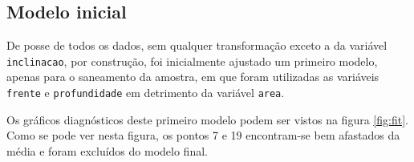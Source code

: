 \documentclass[a4paper, 12pt]{article}
\begin{document}
\hypertarget{modelo-inicial}{%
\subsection{Modelo inicial}\label{modelo-inicial}}

De posse de todos os dados, sem qualquer transformação exceto a da
variável \texttt{inclinacao}, por construção, foi inicialmente ajustado
um primeiro modelo, apenas para o saneamento da amostra, em que foram
utilizadas as variáveis \texttt{frente} e \texttt{profundidade} em
detrimento da variável \texttt{area}.

Os gráficos diagnósticos deste primeiro modelo podem ser vistos na
figura \ref{fig:fit}. Como se pode ver nesta figura, os pontos 7 e 19
encontram-se bem afastados da média e foram excluídos do modelo final.
\end{document}
